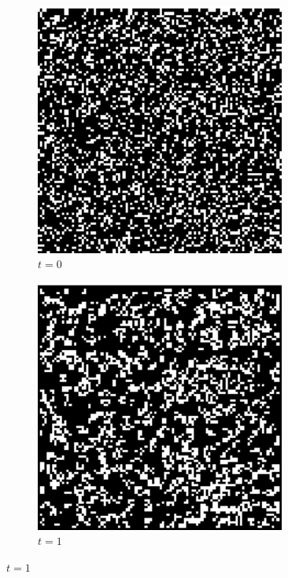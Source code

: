 \documentclass[a4paper,10pt]{article}
\begin{document}
\begin{figure}
 \centering
 \begin{subfigure}{0.4\textwidth} \centering
  \includegraphics[width=0.9\textwidth]{game-of-life-1}
  \caption{$t = 0$}
 \end{subfigure}%
 \begin{subfigure}{0.4\textwidth} \centering
  \includegraphics[width=0.9\textwidth]{game-of-life-2}
  \caption{$t = 1$}
 \end{subfigure}
 

\end{figure}
\end{document}
